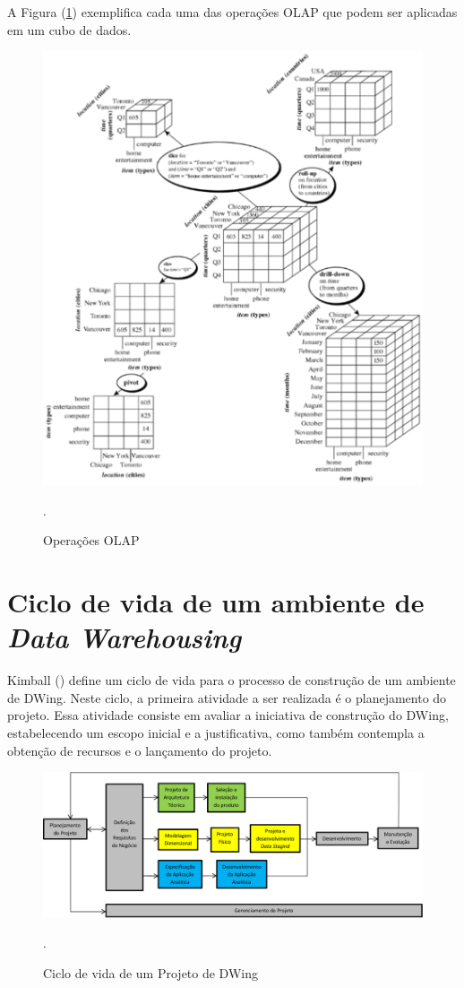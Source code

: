 %

A Figura (\ref{dw-olap}) exemplifica cada uma das operações OLAP que podem ser aplicadas em um cubo de dados.
%
 \begin{figure}[!htb]
 	\centering
 		\includegraphics[scale=1]{figuras/olap}
 		\caption{Operações OLAP}.
 		\label{dw-olap}
 \end{figure}

\section{Ciclo de vida de um ambiente de \emph{Data Warehousing}}
\label{sec-lifecycleDw}
%

Kimball (\citeyear{kimball2002}) define um ciclo de vida para o processo de construção de um ambiente de DWing. Neste ciclo, a primeira atividade a ser realizada é o planejamento do projeto. Essa atividade consiste em avaliar a iniciativa de construção do DWing, estabelecendo um escopo inicial e a justificativa, como também contempla a obtenção  de recursos e o lançamento do projeto.

 \begin{figure}[!htb]
 	\centering
 		\includegraphics[scale=0.7]{figuras/dw-ciclo-de-vida}
 		\caption{Ciclo de vida de um Projeto de DWing \cite{kimball2002}}.
 		\label{dw-lifecycle}
 \end{figure}
%
%

